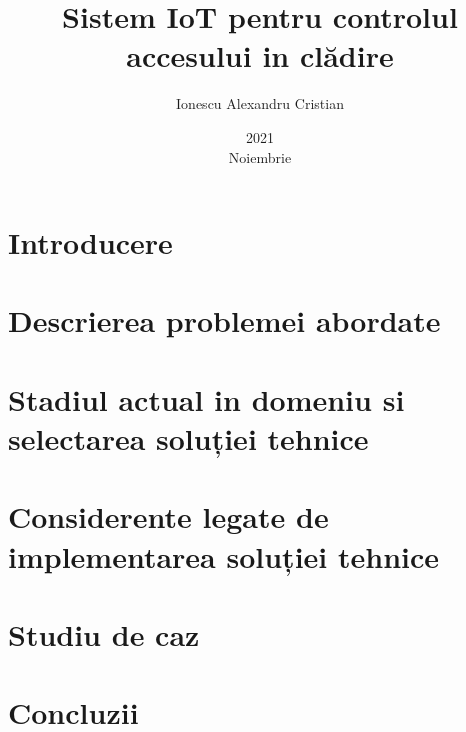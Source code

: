 \documentclass[12pt,romanian]{report}
\title{Sistem IoT pentru controlul\\accesului in clădire}
\date{2021\\ Noiembrie}
\author{Ionescu Alexandru Cristian}
\begin{document}
\maketitle


\tableofcontents

\chapter{Introducere}


\chapter{Descrierea problemei abordate}


\chapter{Stadiul actual in domeniu si selectarea soluției tehnice}


\chapter{Considerente legate de implementarea soluției tehnice}


\chapter{Studiu de caz}


\chapter{Concluzii}


% 

\clearpage

\printglossary[type=\acronymtype]
\printglossary

\printbibliography
\end{document}
